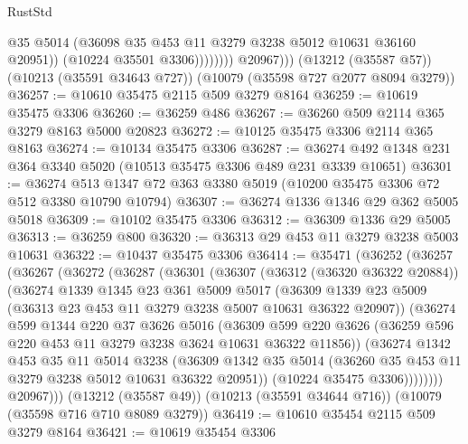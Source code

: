 \begin{lexlean}{RustStd}
\begin{coremodule}
{\begin{coremodule}
{{{{{{{{{{{{{{{{{{{{{{{{{{                          @35
                          @5014
                          (@36098 @35 @453 @11 @3279 @3238 @5012 @10631 @36160 @20951))
                        (@10224 @35501 @3306))))))))
          @20967)))
    (@13212 (@35587 @57))
    (@10213 (@35591 @34643 @727))
    (@10079 (@35598 @727 @2077 @8094 @3279))
@36257 := @10610 @35475 @2115 @509 @3279 @8164
@36259 := @10619 @35475 @3306
@36260 := @36259 @486
@36267 := @36260 @509 @2114 @365 @3279 @8163 @5000 @20823
@36272 := @10125 @35475 @3306 @2114 @365 @8163
@36274 := @10134 @35475 @3306
@36287 := @36274 @492 @1348 @231 @364 @3340 @5020 (@10513 @35475 @3306 @489 @231 @3339 @10651)
@36301 := @36274 @513 @1347 @72 @363 @3380 @5019 (@10200 @35475 @3306 @72 @512 @3380 @10790 @10794)
@36307 := @36274 @1336 @1346 @29 @362 @5005 @5018
@36309 := @10102 @35475 @3306
@36312 := @36309 @1336 @29 @5005
@36313 := @36259 @800
@36320 := @36313 @29 @453 @11 @3279 @3238 @5003 @10631
@36322 := @10437 @35475 @3306
@36414 := @35471
    (@36252
      (@36257
        (@36267
          (@36272
            (@36287
              (@36301
                (@36307
                  (@36312 (@36320 @36322 @20884))
                  (@36274
                    @1339
                    @1345
                    @23
                    @361
                    @5009
                    @5017
                    (@36309
                      @1339
                      @23
                      @5009
                      (@36313 @23 @453 @11 @3279 @3238 @5007 @10631 @36322 @20907))
                    (@36274
                      @599
                      @1344
                      @220
                      @37
                      @3626
                      @5016
                      (@36309
                        @599
                        @220
                        @3626
                        (@36259 @596 @220 @453 @11 @3279 @3238 @3624 @10631 @36322 @11856))
                      (@36274
                        @1342
                        @453
                        @35
                        @11
                        @5014
                        @3238
                        (@36309
                          @1342
                          @35
                          @5014
                          (@36260 @35 @453 @11 @3279 @3238 @5012 @10631 @36322 @20951))
                        (@10224 @35475 @3306))))))))
          @20967)))
    (@13212 (@35587 @49))
    (@10213 (@35591 @34644 @716))
    (@10079 (@35598 @716 @710 @8089 @3279))
@36419 := @10610 @35454 @2115 @509 @3279 @8164
@36421 := @10619 @35454 @3306
}}}}}}}}}}}}}}}}}}}}}}}}}}
\end{coremodule}}
\end{coremodule}
\end{lexlean}

